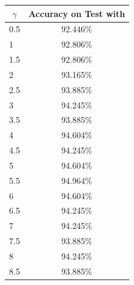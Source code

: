\documentclass[a4paper,10pt,english]{article}
\begin{document}
    \begin{minipage}{\textwidth}
        \begin{minipage}[b]{0.49\textwidth}
            \centering
            \begin{tabular}{|l|c|}
                \hline
                \multicolumn{1}{|c|}{\textbf{$\gamma$}} & \textbf{Accuracy on Test with} \\ \hline
                0.5                              & 92.446\%                       \\ \hline
                1                                & 92.806\%                       \\ \hline
                1.5                              & 92.806\%                       \\ \hline
                2                                & 93.165\%                       \\ \hline
                2.5                              & 93.885\%                       \\ \hline
                3                                & 94.245\%                       \\ \hline
                3.5                              & 93.885\%                       \\ \hline
                4                                & 94.604\%                       \\ \hline
                4.5                              & 94.245\%                       \\ \hline
                5                                & 94.604\%                       \\ \hline
                5.5                              & \cellcolor{green!25} 94.964\%                       \\ \hline
                6                                & 94.604\%                       \\ \hline
                6.5                              & 94.245\%                       \\ \hline
                7                                & 94.245\%                       \\ \hline
                7.5                              & 93.885\%                       \\ \hline
                8                                & 94.245\%                       \\ \hline
                8.5                              & 93.885\%                       \\ \hline

\end{tabular}
\end{minipage}
\end{minipage}
\end{document}
